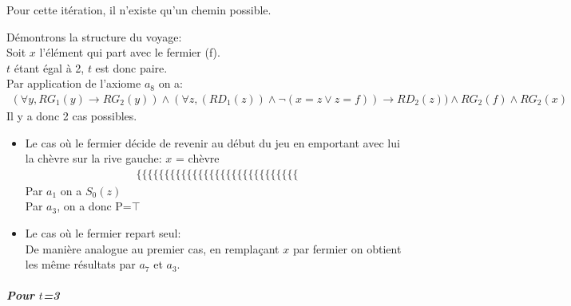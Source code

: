 Pour cette itération, il n'existe qu'un chemin possible.

Démontrons la structure du voyage:\\
Soit $x$ l'élément qui part avec le fermier (f).\\
$t$ étant égal à 2, $t$ est donc paire.\\
Par application de l'axiome $a_8$ on a:
\begin{align*}
    (\forall y, RG_{1}(y) \to RG_{2}(y)) \wedge (\forall z,(RD_{1}(z)) \wedge \neg(x=z \vee z=f)) \rightarrow RD_{2}(z)) \wedge RG_2(f) \wedge RG_2(x)
\end{align*}
Il y a donc 2 cas possibles.\\
\begin{itemize}
    \item \small Le cas où le fermier décide de revenir au début du jeu en emportant avec lui la chèvre sur la rive gauche: $x$ = chèvre\\
    \begin{align*}
        \{\{\{\{\{\{\{\{\{\{\{\{\{\{\{\{\{\{\{\{\{\{\{\{\{\{\{\{\{
    \end{align*}
    Par $a_1$ on a $S_0(z)$\\
    Par $a_3$, on a donc P=$\top$
    \item Le cas où le fermier repart seul:\\
    De manière analogue au premier cas, en remplaçant $x$ par fermier on obtient les même résultats par $a_7$ et $a_3$.
\end{itemize}
\subparagraph*{Pour $t$=3}

